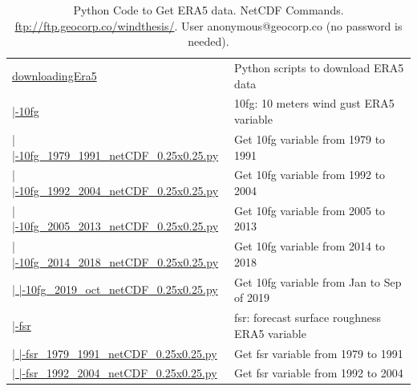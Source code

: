 \documentclass[12pt,oneside]{reedthesis}
\begin{document}
\begingroup\fontsize{8}{10}\selectfont
\begin{longtable}[t]{>{\raggedright\arraybackslash}p{2.3in}>{\raggedright\arraybackslash}p{3in}}
\caption[Python Code to Get ERA5 data. NetCDF Commands]{\label{tab:pythonera5}Python Code to Get ERA5 data. NetCDF Commands.  \href{ftp://ftp.geocorp.co/windthesis/}{ftp://ftp.geocorp.co/windthesis/}. User anonymous@geocorp.co (no password is needed).}\\
\toprule
\multicolumn{1}{l}{Folder Tree - Ftp Links} & \multicolumn{1}{l}{Description}\\
\midrule
\href{ftp://ftp.geocorp.co/windthesis/downloadingEra5/}{downloadingEra5} & Python scripts to download ERA5 data\\
\href{ftp://ftp.geocorp.co/windthesis/downloadingEra5/10fg/}{  |-10fg} & 10fg: 10 meters wind gust ERA5 variable\\
\href{ftp://ftp.geocorp.co/windthesis/downloadingEra5/10fg/10fg_1979_1991_netCDF_0.25x0.25.py}{  |    |-10fg\_1979\_1991\_netCDF\_0.25x0.25.py} & Get 10fg variable from 1979 to 1991\\
\href{ftp://ftp.geocorp.co/windthesis/downloadingEra5/10fg/10fg_1992_2004_netCDF_0.25x0.25.py}{  |    |-10fg\_1992\_2004\_netCDF\_0.25x0.25.py} & Get 10fg variable from 1992 to 2004\\
\href{ftp://ftp.geocorp.co/windthesis/downloadingEra5/10fg/10fg_2005_2013_netCDF_0.25x0.25.py}{  |    |-10fg\_2005\_2013\_netCDF\_0.25x0.25.py} & Get 10fg variable from 2005 to 2013\\
\href{ftp://ftp.geocorp.co/windthesis/downloadingEra5/10fg/10fg_2014_2018_netCDF_0.25x0.25.py}{  |    |-10fg\_2014\_2018\_netCDF\_0.25x0.25.py} & Get 10fg variable from 2014 to 2018\\
\href{ftp://ftp.geocorp.co/windthesis/downloadingEra5/10fg/10fg_2019_oct_netCDF_0.25x0.25.py}{  |    |-10fg\_2019\_oct\_netCDF\_0.25x0.25.py} & Get 10fg variable from Jan to Sep of 2019\\
\href{ftp://ftp.geocorp.co/windthesis/downloadingEra5/fsr/}{  |-fsr} & fsr: forecast surface roughness ERA5 variable\\
\href{ftp://ftp.geocorp.co/windthesis/downloadingEra5/fsr/fsr_1979_1991_netCDF_0.25x0.25.py}{  |    |-fsr\_1979\_1991\_netCDF\_0.25x0.25.py} & Get fsr variable from 1979 to 1991\\
\href{ftp://ftp.geocorp.co/windthesis/downloadingEra5/fsr/fsr_1992_2004_netCDF_0.25x0.25.py}{  |    |-fsr\_1992\_2004\_netCDF\_0.25x0.25.py} & Get fsr variable from 1992 to 2004\\

\end{longtable}
\end{document}
